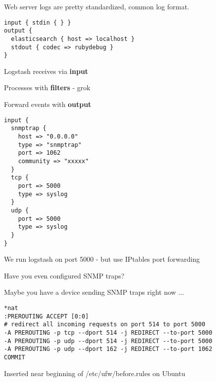 \documentclass[Screen16to9,17pt]{foils}
\begin{document}
Web server logs are pretty standardized, common log format.





\begin{verbatim}
input { stdin { } }
output {
  elasticsearch { host => localhost }
  stdout { codec => rubydebug }
}
\end{verbatim}



\begin{list2}
\item Logstash receives via {\bf input}
\item Processes with {\bf filters} - grok
\item Forward events with {\bf output}
\end{list2}




{\footnotesize
\begin{verbatim}
input {
  snmptrap {
    host => "0.0.0.0"
    type => "snmptrap"
    port => 1062
    community => "xxxxx"
  }
  tcp {
    port => 5000
    type => syslog
  }
  udp {
    port => 5000
    type => syslog
  }
}
\end{verbatim}
}

\begin{list2}
\item We run logstash on port 5000 - but use IPtables port forwarding
\end{list2}

\centerline{Have you even configured SNMP traps?}

Maybe you have a device sending SNMP traps right now ...


{\footnotesize
\begin{verbatim}
*nat
:PREROUTING ACCEPT [0:0]
# redirect all incoming requests on port 514 to port 5000
-A PREROUTING -p tcp --dport 514 -j REDIRECT --to-port 5000
-A PREROUTING -p udp --dport 514 -j REDIRECT --to-port 5000
-A PREROUTING -p udp --dport 162 -j REDIRECT --to-port 1062
COMMIT
\end{verbatim}
}

\centerline{Inserted near beginning of /etc/ufw/before.rules on Ubuntu}
\end{document}
